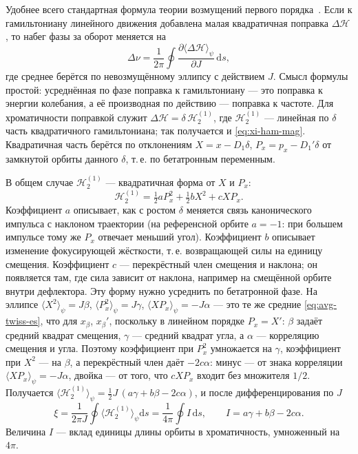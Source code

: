 Удобнее всего стандартная формула теории возмущений первого порядка~\cite{Ruth1987,Lee2019,Wiedemann2015}. Если к гамильтониану линейного движения добавлена малая квадратичная поправка $\Delta\mathcal{H}$, то набег фазы за оборот меняется на
\begin{equation*}
\Delta\nu=\frac{1}{2\pi}\oint\frac{\partial\langle\Delta\mathcal{H}\rangle_\psi}{\partial J}\,\mathrm{d}s,
\end{equation*}
где среднее берётся по невозмущённому эллипсу с действием $J$. Смысл формулы простой: усреднённая по фазе поправка к гамильтониану --- это поправка к энергии колебания, а её производная по действию --- поправка к частоте. Для хроматичности поправкой служит $\Delta\mathcal{H}=\delta\,\mathcal{H}_2^{(1)}$, где $\mathcal{H}_2^{(1)}$ --- линейная по $\delta$ часть квадратичного гамильтониана; так получается и \eqref{eq:xi-ham-mag}. Квадратичная часть берётся по отклонениям $X=x-D_1\delta$, $P_x=p_x-D_1'\delta$ от замкнутой орбиты данного $\delta$, т.\,е. по бетатронным переменным.

В общем случае $\mathcal{H}_2^{(1)}$ --- квадратичная форма от $X$ и $P_x$:
\begin{equation*}
\mathcal{H}_2^{(1)}=\tfrac12aP_x^2+\tfrac12bX^2+cXP_x.
\end{equation*}
Коэффициент $a$ описывает, как с ростом $\delta$ меняется связь канонического импульса с наклоном траектории (на референсной орбите $a=-1$: при большем импульсе тому же $P_x$ отвечает меньший угол). Коэффициент $b$ описывает изменение фокусирующей жёсткости, т.\,е. возвращающей силы на единицу смещения. Коэффициент $c$ --- перекрёстный член смещения и наклона; он появляется там, где сила зависит от наклона, например на смещённой орбите внутри дефлектора. Эту форму нужно усреднить по бетатронной фазе. На эллипсе $\langle X^2\rangle_\psi=J\beta$, $\langle P_x^2\rangle_\psi=J\gamma$, $\langle XP_x\rangle_\psi=-J\alpha$ --- это те же средние \eqref{eq:avg-twiss-es}, что для $x_\beta$, $x_\beta'$, поскольку в линейном порядке $P_x=X'$: $\beta$ задаёт средний квадрат смещения, $\gamma$ --- средний квадрат угла, а $\alpha$ --- корреляцию смещения и угла. Поэтому коэффициент при $P_x^2$ умножается на $\gamma$, коэффициент при $X^2$ --- на $\beta$, а перекрёстный член даёт $-2c\alpha$: минус --- от знака корреляции $\langle XP_x\rangle_\psi=-J\alpha$, двойка --- от того, что $cXP_x$ входит без множителя $1/2$. Получается $\langle\mathcal{H}_2^{(1)}\rangle_\psi=\tfrac12J\,(a\gamma+b\beta-2c\alpha)$, и после дифференцирования по $J$
\begin{equation}
\label{eq:xi-ham}
\xi=\frac{1}{2\pi J}\oint\bigl\langle\mathcal{H}_2^{(1)}\bigr\rangle_\psi\mathrm{d}s
=\frac{1}{4\pi}\oint I\,\mathrm{d}s,
\qquad
I=a\gamma+b\beta-2c\alpha.
\end{equation}
Величина $I$ --- вклад единицы длины орбиты в хроматичность, умноженный на $4\pi$.

